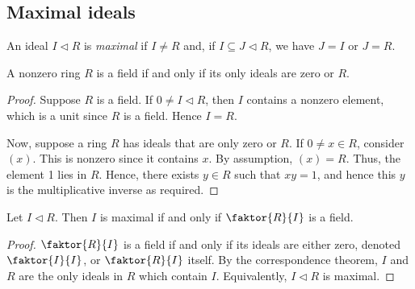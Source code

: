 \subsection{Maximal ideals}
\begin{definition}
	An ideal \( I \triangleleft R \) is \textit{maximal} if \( I \neq R \) and, if \( I \subseteq J \triangleleft R \), we have \( J = I \) or \( J = R \).
\end{definition}
\begin{lemma}
	A nonzero ring \( R \) is a field if and only if its only ideals are zero or \( R \).
\end{lemma}
\begin{proof}
	Suppose \( R \) is a field.
	If \( 0 \neq I \triangleleft R \), then \( I \) contains a nonzero element, which is a unit since \( R \) is a field.
	Hence \( I = R \).

	Now, suppose a ring \( R \) has ideals that are only zero or \( R \).
	If \( 0 \neq x \in R \), consider \( (x) \).
	This is nonzero since it contains \( x \).
	By assumption, \( (x) = R \).
	Thus, the element 1 lies in \( R \).
	Hence, there exists \( y \in R \) such that \( xy = 1 \), and hence this \( y \) is the multiplicative inverse as required.
\end{proof}
\begin{proposition}
	Let \( I \triangleleft R \).
	Then \( I \) is maximal if and only if \( \faktor{R}{I} \) is a field.
\end{proposition}
\begin{proof}
	\( \faktor{R}{I} \) is a field if and only if its ideals are either zero, denoted \( \faktor{I}{I} \), or \( \faktor{R}{I} \) itself.
	By the correspondence theorem, \( I \) and \( R \) are the only ideals in \( R \) which contain \( I \).
	Equivalently, \( I \triangleleft R \) is maximal.
\end{proof}

